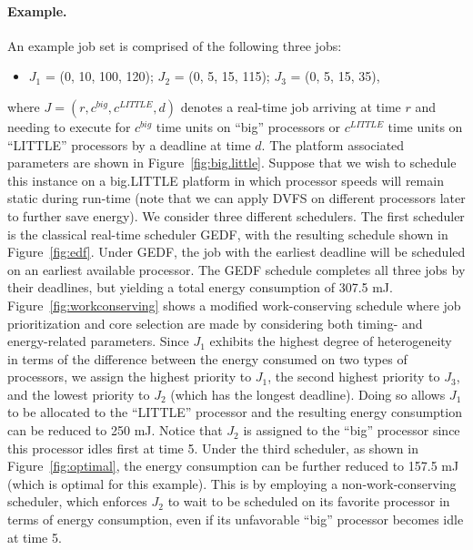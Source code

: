 \paragraph{Example.}
An example job set is comprised of the following three jobs:
\begin{itemize}
\item $J_1$ = (0, 10, 100, 120); $J_2$ = (0, 5, 15, 115); $J_3$ = (0, 5, 15, 35),
\end{itemize}
 where $J = (r, c^{big}, c^{LITTLE}, d)$ denotes a real-time job arriving at time $r$ and needing to execute for $c^{big}$ time units on ``big'' processors or $c^{LITTLE}$ time units on ``LITTLE'' processors by a deadline at time $d$. 
 The platform associated parameters are shown in Figure~\ref{fig:big.little}. Suppose that we wish to schedule this instance on a big.LITTLE platform in which processor speeds will remain static during run-time (note that we can apply  DVFS on different processors later to further save energy). We consider three different schedulers. The first scheduler is the classical real-time scheduler GEDF, with the resulting schedule shown in Figure~\ref{fig:edf}. Under GEDF, the job with the earliest deadline will be scheduled on an earliest available processor. The GEDF schedule completes all three jobs by their deadlines, but yielding a total energy consumption of 307.5 mJ. Figure~\ref{fig:workconserving} shows a modified work-conserving schedule where job prioritization and core selection are made by considering both timing- and energy-related parameters. Since $J_1$ exhibits the highest degree of heterogeneity in terms of the difference between the energy consumed on two types of processors, we assign the highest priority to $J_1$, the second highest priority to $J_3$, and the lowest priority to $J_2$ (which has the longest deadline). Doing so allows $J_1$ to be allocated to the ``LITTLE'' processor and the resulting energy consumption can be reduced to 250 mJ. Notice that $J_2$ is assigned to the ``big'' processor since this processor idles first at time 5. Under the third scheduler, as shown in Figure~\ref{fig:optimal}, the energy consumption can be further reduced to 157.5 mJ (which is optimal for this example). This is by employing a non-work-conserving scheduler, which enforces $J_2$ to wait to be scheduled on its favorite processor in terms of energy consumption, even if its unfavorable ``big'' processor becomes idle at time 5.


